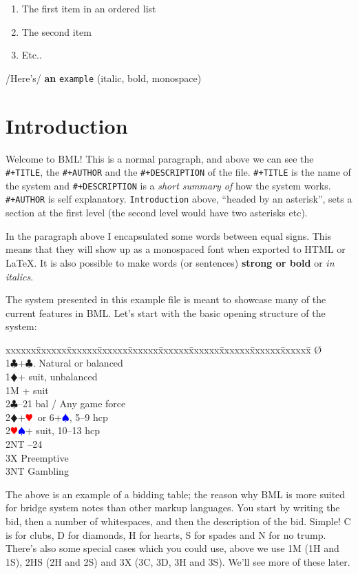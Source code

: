 \documentclass[a4paper]{article}
\newcommand{\BC}{\textcolor{OliveGreen}{$\clubsuit$}}
\newcommand{\BD}{\textcolor{RedOrange}{$\vardiamondsuit$}}
\newcommand{\BH}{\textcolor{Red}{$\varheartsuit${}}}
\newcommand{\BS}{\textcolor{Blue}{$\spadesuit${}}}
\newenvironment{bidtable}
{\begin{tabbing}

xxxxxx\=xxxxxx\=xxxxxx\=xxxxxx\=xxxxxx\=xxxxxx\=xxxxxx\=xxxxxx\=xxxxxx\=xxxxxx\=\kill}
{\end{tabbing} }%
\begin{document}
\begin{enumerate}
\item The first item in an ordered list

\item The second item

\item Etc..

\end{enumerate}

/Here's/ \textbf{an} \texttt{example} (italic, bold, monospace)

\section{Introduction}

Welcome to BML! This is a normal paragraph, and above we can see
the \texttt{\#+TITLE}, the \texttt{\#+AUTHOR} and the \texttt{\#+DESCRIPTION} of the file. \texttt{\#+TITLE} is
the name of the system and \texttt{\#+DESCRIPTION} is a \emph{short summary of} how
the system works. \texttt{\#+AUTHOR} is self explanatory. \texttt{Introduction} above,
``headed by an asterisk'', sets a section at the first level (the second
level would have two asterisks etc).

In the paragraph above I encapsulated some words between equal
signs. This means that they will show up as a monospaced font when
exported to HTML or LaTeX. It is also possible to make words (or
sentences) \textbf{strong or bold} or \emph{in italics}.

The system presented in this example file is meant to showcase many
of the current features in BML. Let's start with the basic opening
structure of the system:

\begin{bidtable}
\O\+\\
1\BC {}+\BC . Natural or balanced\\
1\BD {}+ suit, unbalanced\\
1M + suit\\
2\BC {}--21 bal / Any game force\\
2\BD {}+\BH\ or 6+\BS , 5--9 hcp\\
2\BH\BS {}+ suit, 10--13 hcp\\
2NT --24\\
3X \> Preemptive\\
3NT \> Gambling\-
\end{bidtable}

The above is an example of a bidding table; the reason why BML is
more suited for bridge system notes than other markup languages. You
start by writing the bid, then a number of whitespaces, and then the
description of the bid. Simple! C is for clubs, D for diamonds, H
for hearts, S for spades and N for no trump. There's also some
special cases which you could use, above we use 1M (1H and 1S), 2HS
(2H and 2S) and 3X (3C, 3D, 3H and 3S). We'll see more of these
later.
\end{document}
